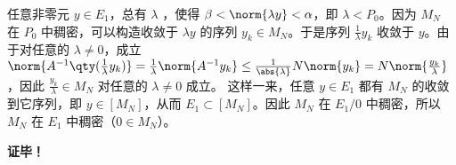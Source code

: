 任意非零元 $y\in E_1$，总有 $\lambda$ ，使得 $\beta<\norm{\lambda y}<\alpha$，即 $\lambda<P_0$。因为 $M_N$ 在 $P_0$ 中稠密，可以构造收敛于 $\lambda y$ 的序列 $y_k\in M_N$。于是序列 $\frac{1}{\lambda}y_k$ 收敛于 $y$。由于对任意的 $\lambda\neq0$，成立 $\norm{A^{-1}\qty(\frac{1}{\lambda}y_k)}=\frac{1}{\lambda}\norm{A^{-1}y_k}\leq\frac{1}{\abs{\lambda}}N\norm{y_k}=N\norm{\frac{y_k}{\lambda}}$，因此 $\frac{y_k}{\lambda}\in M_N$ 对任意的 $\lambda\neq0$ 成立。
这样一来，任意 $y\in E_1$ 都有 $M_N$ 的收敛到它序列，即 $y\in[M_N]$，从而 $E_1\subset [M_N]$。因此 $M_N$ 在 $E_1/0$ 中稠密，所以 $M_N$ 在 $E_1$ 中稠密（$0\in M_N$）。




\textbf{证毕！}



